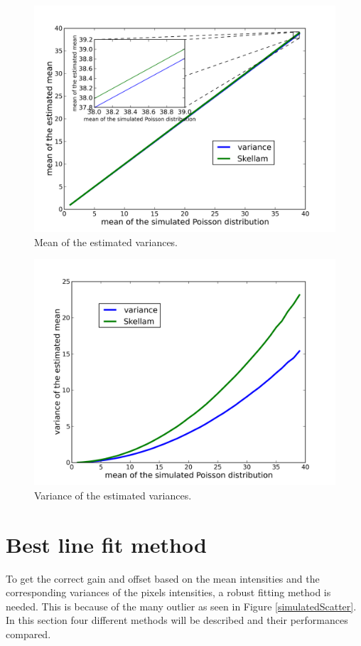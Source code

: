\begin{figure}
\centering
\includegraphics[width = .7\textwidth]{pictures/SkellamVarMean.png}
\caption{Mean of the estimated variances.}\label{skellamvarmean}
\end{figure}

\begin{figure}
\centering
\includegraphics[width = .7\textwidth]{pictures/SkellamVarVar.png}
\caption{Variance of the estimated variances.}\label{skellamvarvar}
\end{figure}


\section{Best line fit method}
To get the correct gain and offset based on the mean intensities and the corresponding variances of the pixels intensities, a robust fitting method is needed. This is because of the many outlier as seen in Figure \ref{simulatedScatter}. In this section four different methods will be described and their performances compared.
